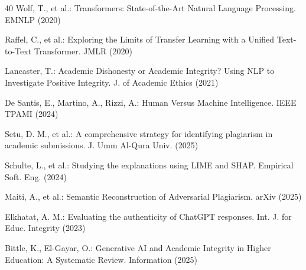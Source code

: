 \documentclass[pdflatex,sn-basic]{sn-jnl}
\begin{document}
\begin{thebibliography}{40}
Wolf, T., et al.: Transformers: State-of-the-Art Natural Language Processing. EMNLP (2020)

Raffel, C., et al.: Exploring the Limits of Transfer Learning with a Unified Text-to-Text Transformer. JMLR (2020)

Lancaster, T.: Academic Dishonesty or Academic Integrity? Using NLP to Investigate Positive Integrity. J. of Academic Ethics (2021)

De Santis, E., Martino, A., Rizzi, A.: Human Versus Machine Intelligence. IEEE TPAMI (2024)

Setu, D. M., et al.: A comprehensive strategy for identifying plagiarism in academic submissions. J. Umm Al-Qura Univ. (2025)

Schulte, L., et al.: Studying the explanations using LIME and SHAP. Empirical Soft. Eng. (2024)

Maiti, A., et al.: Semantic Reconstruction of Adversarial Plagiarism. arXiv (2025)

Elkhatat, A. M.: Evaluating the authenticity of ChatGPT responses. Int. J. for Educ. Integrity (2023)

Bittle, K., El-Gayar, O.: Generative AI and Academic Integrity in Higher Education: A Systematic Review. Information (2025)

\end{thebibliography}
\end{document}
